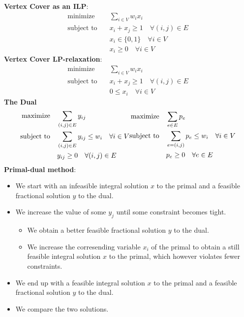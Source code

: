 \documentclass[onecolumn]{report}
\begin{document}
\textbf{Vertex Cover as an ILP}:\\
\begin{equation*}
    \begin{aligned}
    \text{minimize} \quad & \sum_{i \in V} w_i x_i\\
    \text{subject to} \quad & x_i + x_j \geq 1 \quad \forall (i,j) \in E\\
    & x_i \in \{0,1\} \quad \forall i \in V\\
    &x_i \geq 0 \quad \forall i \in V
    \end{aligned}
\end{equation*}
\textbf{Vertex Cover LP-relaxation}:\\
\begin{equation*}
    \begin{aligned}
    \text{minimize} \quad & \sum_{i \in V} w_i x_i\\
    \text{subject to} \quad & x_i + x_j \geq 1 \quad \forall (i,j) \in E\\
    & 0 \leq x_i \quad \forall i \in V
    \end{aligned}
\end{equation*}
\textbf{The Dual}
\begin{equation*}
    \begin{aligned}
    \text{maximize} \quad & \sum_{(i,j) \in E} y_{ij}\\
    \text{subject to} \quad & \sum_{(i,j) \in E} y_{ij} \leq w_i \quad \forall i \in V\\
    & y_{ij} \geq 0 \quad \forall (i,j) \in E
    \end{aligned}\\
    \begin{aligned}
    \text{maximize} \quad & \sum_{e \in E} p_e\\
    \text{subject to} \quad & \sum_{e=(i,j)} p_e \leq w_i \quad \forall i \in V\\
    & p_e \geq 0 \quad \forall e \in E
    \end{aligned}
\end{equation*}
\textbf{Primal-dual method}:\\
\begin{itemize}
    \item We start with an infeasible integral solution $x$ to the primal and a feasible fractional solution $y$ to the dual.
    \item We increase the value of some $y_j$ until some constraint becomes tight.
    \begin{itemize}
        \item We obtain a better feasible fractional solution $y$ to the dual.
        \item We increase the corresending variable $x_i$ of the primal to obtain a still feasible integral solution $x$ to the primal, which however violates fewer constraints.
    \end{itemize}
    \item We end up  with a feasible integral solution $x$ to the primal and a feasible fractional solution $y$ to the dual.
    \item We compare the two solutions.
\end{itemize}
\end{document}
